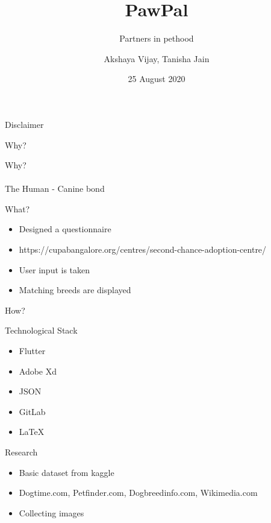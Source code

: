 \documentclass[14pt]{beamer}
\title[Pawpal]{PawPal}
\subtitle[Partners of pethood]{Partners in pethood}
\author[Team 42]{Akshaya Vijay, Tanisha Jain}
\date{25 August 2020}
\begin{document}
\begin{frame}
    \titlepage
\end{frame}

\begin{frame}[standout]
    Disclaimer 
\end{frame}

\begin{frame}[standout]
   Why?
\end{frame}

\begin{frame}[standout]
   Why?
   \\ \\\alert{The Human - Canine bond}
\end{frame}

\begin{frame}[standout]
   What?
\end{frame}

\begin{frame}
    \begin{itemize}
        \item Designed a questionnaire 
        \item https://cupabangalore.org/centres/second-chance-adoption-centre/
        \item User input is taken
        \item Matching breeds are displayed
    \end{itemize}
\end{frame}

\begin{frame}[standout]
   How?
\end{frame}

\begin{frame}{Technological Stack}
    \begin{itemize}
        \item Flutter
        \item Adobe Xd
        \item JSON
        \item GitLab
        \item LaTeX
    \end{itemize}
\end{frame}

\begin{frame}{Research}
    \begin{itemize}
        \item Basic dataset from kaggle
        \item Dogtime.com, Petfinder.com, Dogbreedinfo.com, Wikimedia.com
        \item Collecting images 
    \end{itemize}
\end{frame}
\end{document}
